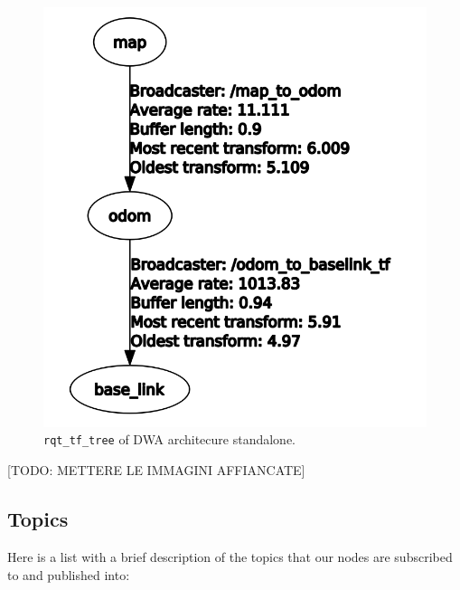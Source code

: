 \documentclass[11pt,a4paper]{article}
\begin{document}
\begin{figure}[H]
    \centering
    \includegraphics[scale=0.3]{ros_tools/rqttftree_dwa.png}
    \caption{\texttt{rqt\_tf\_tree} of DWA architecure standalone.}
\end{figure}

[TODO: METTERE LE IMMAGINI AFFIANCATE]

\subsection{Topics}

Here is a list with a brief description of the topics that our nodes are subscribed to and published into:\\
\end{document}
